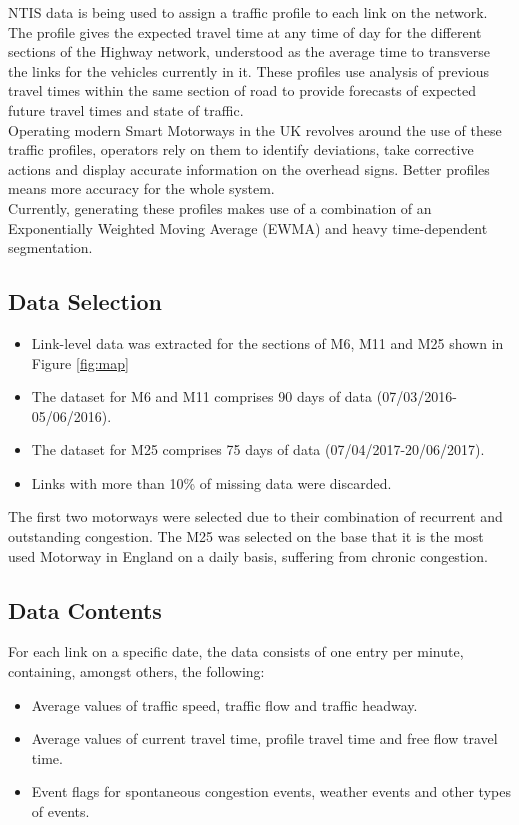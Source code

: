 \documentclass[conference]{IEEEtran}
\begin{document}
NTIS data is being used to assign a traffic profile to each link on the network. 
The profile gives the expected travel time at any time of day for the different sections of the Highway network, understood as the average time to transverse the links for the vehicles currently in it. 
These profiles use analysis of previous travel times within the same section of road to provide forecasts of expected future travel times and state of traffic.\\

Operating modern Smart Motorways in the UK revolves around the use of these traffic profiles, operators rely on them to identify deviations, take corrective actions and display accurate information on the overhead signs. 
Better profiles means more accuracy for the whole system.\\

Currently, generating these profiles makes use of a combination of an Exponentially Weighted Moving Average (EWMA) and heavy time-dependent segmentation. 


\subsection{Data Selection}
\begin{itemize}
	\item Link-level data was extracted for the sections of M6, M11 and M25 shown in Figure \ref{fig:map}
	\item The dataset for M6 and M11 comprises 90 days of data (07/03/2016-05/06/2016).
	\item The dataset for M25 comprises 75 days of data (07/04/2017-20/06/2017).
	\item Links with more than 10\% of missing data were discarded.
\end{itemize}
The first two motorways were selected due to their combination of recurrent and outstanding congestion. 
The M25 was selected on the base that it is the most used Motorway in England on a daily basis, suffering from chronic congestion.
\subsection{Data Contents}
For each link on a specific date, the data consists of one entry per minute, containing, amongst others, the following:
\begin{itemize}
	\item Average values of traffic speed, traffic flow and traffic headway.
	\item Average values of current travel time, profile travel time and free flow travel time.
	\item Event flags for spontaneous congestion events, weather events and other types of events.	
\end{itemize}
\end{document}
